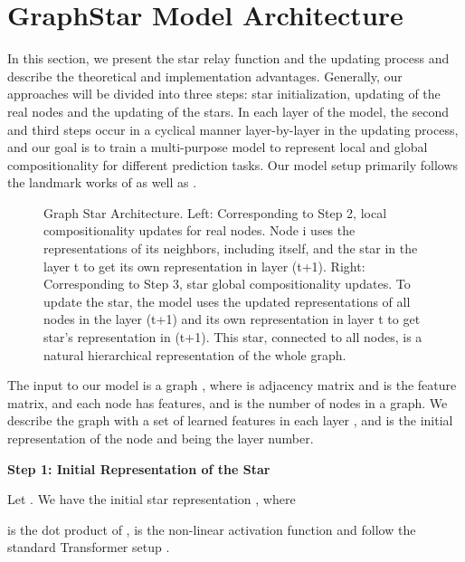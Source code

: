 \documentclass{article}
\begin{document}
\section{GraphStar Model Architecture}

In this section, we present the star relay function and the updating process and describe the theoretical and implementation advantages. Generally, our approaches will be divided into three steps: star initialization, updating of the real nodes and the updating of the stars. In each layer of the model, the second and third steps occur in a cyclical manner layer-by-layer in the updating process, and our goal is to train a multi-purpose model to represent local and global compositionality for different prediction tasks. Our model setup primarily follows the landmark works of \cite{velivckovic2017graph,wang2018non} as well as \cite{guo2019star}. 



\begin{figure}[htb]
      \caption{\label{fig:Graph Star Architecture} Graph Star Architecture. Left: Corresponding to Step 2, local compositionality updates for real nodes. Node i uses the representations of its neighbors, including itself, and the star in the layer t to get its own representation in layer (t+1). Right: Corresponding to Step 3, star global compositionality updates. To update the star, the model uses the updated representations of all nodes in the layer (t+1) and its own representation in layer t to get star’s representation in (t+1). This star, connected to all nodes, is a natural hierarchical representation of the whole graph.}
\end{figure}

The input to our model is a graph , where   is adjacency matrix and  is the feature matrix, and each node has  features, and  is the number of nodes in a graph. We describe the graph with a set of learned features in each layer , and  is the initial representation of the node  and  being the layer number. 

\textbf{Step 1: Initial Representation of the Star}

Let . We have the initial star representation , where



 is the dot product of ,  is the non-linear activation function and  follow the standard Transformer setup \cite{vaswani2017attention}. 

\vspace{1mm}
\end{document}
